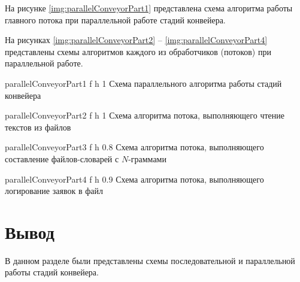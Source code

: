 На рисунке \ref{img:parallelConveyorPart1} представлена схема алгоритма работы главного потока при параллельной работе стадий конвейера.

На рисунках \ref{img:parallelConveyorPart2} – \ref{img:parallelConveyorPart4} представлены схемы алгоритмов каждого из обработчиков (потоков) при параллельной работе.

{parallelConveyorPart1} %
{f} %
{h} %
{1\textwidth} %
{Схема параллельного алгоритма работы стадий конвейера} %

{parallelConveyorPart2} %
{f} %
{h} %
{1\textwidth} %
{Схема алгоритма потока, выполняющего чтение текстов из файлов} %

{parallelConveyorPart3} %
{f} %
{h} %
{0.8\textwidth} %
{Схема алгоритма потока, выполняющего составление файлов-словарей с $N$-граммами} %

{parallelConveyorPart4} %
{f} %
{h} %
{0.9\textwidth} %
{Схема алгоритма потока, выполняющего логирование заявок в файл} %

\clearpage

\section*{Вывод}

В данном разделе были представлены схемы последовательной и параллельной работы стадий конвейера.



